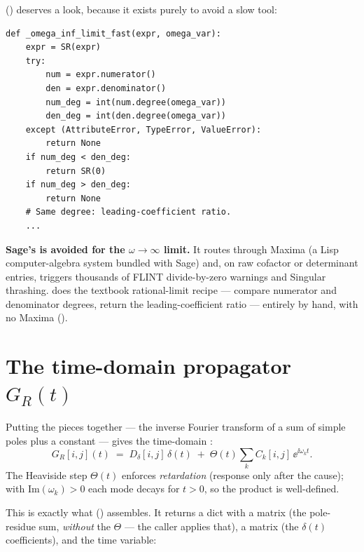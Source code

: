  () deserves a
look, because it exists purely to avoid a slow tool:

\begin{lstlisting}
def _omega_inf_limit_fast(expr, omega_var):
    expr = SR(expr)
    try:
        num = expr.numerator()
        den = expr.denominator()
        num_deg = int(num.degree(omega_var))
        den_deg = int(den.degree(omega_var))
    except (AttributeError, TypeError, ValueError):
        return None
    if num_deg < den_deg:
        return SR(0)
    if num_deg > den_deg:
        return None
    # Same degree: leading-coefficient ratio.
    ...
\end{lstlisting}

\begin{gotcha}
\textbf{Sage's  is avoided for the $\omega \to \infty$ limit.} It
routes through Maxima (a Lisp computer-algebra system bundled with Sage) and, on
raw cofactor or determinant entries, triggers thousands of FLINT divide-by-zero
warnings and Singular thrashing.  does the
textbook rational-limit recipe --- compare numerator and denominator degrees,
return the leading-coefficient ratio --- entirely by hand, with no Maxima
().
\end{gotcha}

\section{The time-domain propagator \texorpdfstring{$G_R(t)$}{G\_R(t)}}

Putting the pieces together --- the inverse Fourier transform of a sum of simple
poles plus a constant --- gives the time-domain :
\begin{equation}
  G_R[i,j](t) \;=\; D_\delta[i,j]\,\delta(t)
  \;+\; \Theta(t)\sum_k C_k[i,j]\,\ee^{\ii\omega_k t}.
  \label{eq:GR}
\end{equation}
The Heaviside step $\Theta(t)$ enforces \emph{retardation} (response only after
the cause); with $\mathrm{Im}(\omega_k) > 0$ each mode decays for $t > 0$, so the
product is well-defined.

This is exactly what 
() assembles. It
returns a dict with a  matrix (the pole-residue sum, \emph{without}
the $\Theta$ --- the caller applies that), a  matrix (the $\delta(t)$
coefficients), and the time variable:

